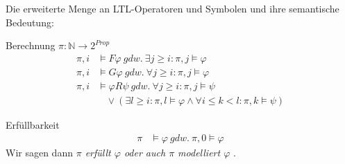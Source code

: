 \begin{frame}{\insertsubsection}
    Die erweiterte Menge an LTL-Operatoren und Symbolen und ihre semantische Bedeutung:
    \begin{block}{Berechnung $\pi : \mathbb{N} \rightarrow 2^{Prop}$}
    \vspace*{-1em}
    \begin{equation*}
        \begin{split}
            \pi, i &\models F\varphi\ gdw.\ \exists j \geq i: \pi, j \models \varphi\\
            \pi, i &\models G\varphi \ gdw.\ \forall j \geq i: \pi, j \models \varphi\\
            \pi, i &\models \varphi R\psi\ gdw.\ \forall j \geq i: \pi, j \models \psi \\
            &\ \ \ \ \lor (\exists l \geq i: \pi, l \models \varphi \land \forall i \leq k < l: \pi, k \models \psi)
        \end{split}
    \end{equation*}
    \end{block}
    \pause
    \begin{block}{Erfüllbarkeit}
    \vspace*{-1em}
    \begin{equation*}
        \begin{split}
            \pi &\models \varphi\ gdw.\ \pi, 0 \models \varphi
        \end{split}
    \end{equation*}
    Wir sagen dann \textit{$\pi$ erfüllt $\varphi$ oder auch $\pi$ modelliert $\varphi$} \cite{vardi+96}.
    \end{block}
\end{frame}